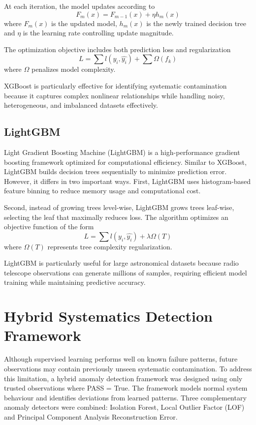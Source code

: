 \documentclass[linenumbers,trackchanges]{aastex701}
\begin{document}
At each iteration, the model updates according to
\begin{equation}
F_m(x)=F_{m-1}(x)+\eta h_m(x)
\end{equation}
where $F_m(x)$ is the updated model, $h_m(x)$ is the newly trained decision tree and $\eta$ is the learning rate controlling update magnitude.

The optimization objective includes both prediction loss and regularization
\begin{equation}
L=\sum l(y_i,\hat{y_i})+\sum \Omega(f_k)
\end{equation}
where $\Omega$ penalizes model complexity.

XGBoost is particularly effective for identifying systematic contamination because it captures complex nonlinear relationships while handling noisy, heterogeneous, and imbalanced datasets effectively.

\subsection{LightGBM}
Light Gradient Boosting Machine (LightGBM) is a high-performance gradient boosting framework optimized for computational efficiency. Similar to XGBoost, LightGBM builds decision trees sequentially to minimize prediction error. However, it differs in two important ways. First, LightGBM uses histogram-based feature binning to reduce memory usage and computational cost.

Second, instead of growing trees level-wise, LightGBM grows trees leaf-wise, selecting the leaf that maximally reduces loss. The algorithm optimizes an objective function of the form
\begin{equation}
L=\sum l(y_i,\hat{y_i})+\lambda \Omega(T)
\end{equation}
where $\Omega(T)$ represents tree complexity regularization.

LightGBM is particularly useful for large astronomical datasets because radio telescope observations can generate millions of samples, requiring efficient model training while maintaining predictive accuracy.

\section{Hybrid Systematics Detection Framework}
Although supervised learning performs well on known failure patterns, future observations may contain previously unseen systematic contamination. To address this limitation, a hybrid anomaly detection framework was designed using only trusted observations where PASS = True. The framework models normal system behaviour and identifies deviations from learned patterns. Three complementary anomaly detectors were combined: Isolation Forest, Local Outlier Factor (LOF) and Principal Component Analysis Reconstruction Error.
\end{document}
